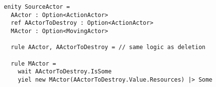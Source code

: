 \begin{lstlisting}
enity SourceActor =
  AActor : Option<ActionActor>
  ref AActorToDestroy : Option<ActionActor>
  MActor : Option<MovingActor>
  
  rule AActor, AActorToDestroy = // same logic as deletion
  
  rule MActor = 
    wait AActorToDestroy.IsSome
    yiel new MActor(AActorToDestroy.Value.Resources) |> Some
\end{lstlisting}